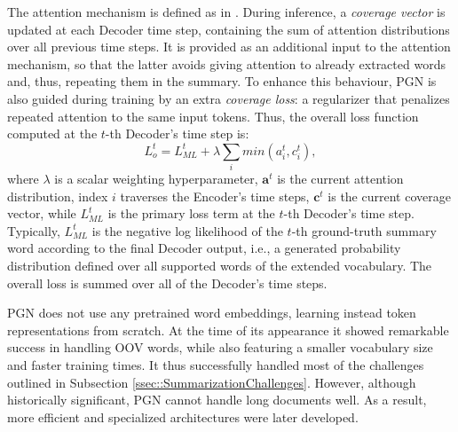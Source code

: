 \documentclass[preprint,review,10pt]{elsarticle}
\begin{document}
	The attention mechanism is defined as in \cite{bahdanau}. During inference, a \textit{coverage vector} is updated at each Decoder time step, containing the sum of attention distributions over all previous time steps. It is provided as an additional input to the attention mechanism, so that the latter avoids giving attention to already extracted words and, thus, repeating them in the summary. To enhance this behaviour, PGN is also guided during training by an extra \textit{coverage loss}: a regularizer that penalizes repeated attention to the same input tokens. Thus, the overall loss function computed at the $t$-th Decoder's time step is:
	\begin{equation}
		L_{o}^t = L_{ML}^t + \lambda \sum_i min(a_i^t, c_i^t),
	\end{equation}
	\noindent where $\lambda$ is a scalar weighting hyperparameter, $\mathbf{a}^t$ is the current attention distribution, index $i$ traverses the Encoder's time steps, $\mathbf{c}^t$ is the current coverage vector, while $L_{ML}^t$ is the primary loss term at the $t$-th Decoder's time step. Typically, $L_{ML}^t$ is the negative log likelihood of the $t$-th ground-truth summary word according to the final Decoder output, i.e., a generated probability distribution defined over all supported words of the extended vocabulary. The overall loss is summed over all of the Decoder's time steps.%
	
	PGN does not use any pretrained word embeddings, learning instead token representations from scratch. At the time of its appearance it showed remarkable success in handling OOV words, while also featuring a smaller vocabulary size and faster training times. It thus successfully handled most of the challenges outlined in Subsection \ref{ssec::SummarizationChallenges}. However, although historically significant, PGN cannot handle long documents well. As a result, more efficient and specialized architectures were later developed.
	
\end{document}
